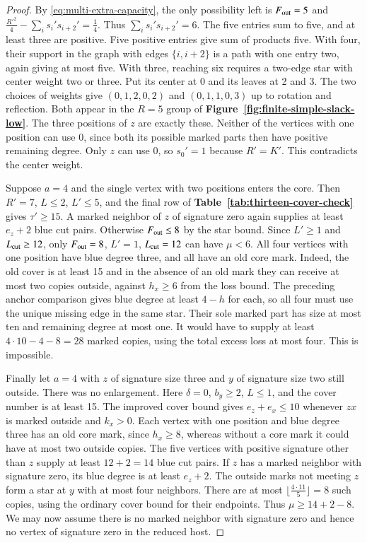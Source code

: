 \documentclass[preprint,11pt,numbers]{elsarticle-arxiv}
\numberwithin{equation}{section}
\theoremstyle{definition}
\begin{document}
\begin{proof}
By \eqref{eq:multi-extra-capacity}, the only possibility left is
$F_{\rm out}=5$ and
$\frac{R'^2}{4}-\sum_i s_i's_{i+2}'=\frac{1}{4}$. Thus $\sum_i s_i's_{i+2}'=6$.
The five entries sum to five, and at least three are positive.
Five positive entries give sum of products five. With four, their
support in the graph with edges $\{i,i+2\}$ is a path with one entry
two, again giving at most five. With three, reaching six requires a
two-edge star with center weight two or three. Put its center at 0
and its leaves at 2 and 3. The two choices of weights give
$(0,1,2,0,2)$ and $(0,1,1,0,3)$ up to rotation and reflection. Both
appear in the $R=5$ group of \textbf{Figure~\ref{fig:finite-simple-slack-low}}.
The three positions of $z$ are exactly
these. Neither of the vertices with one position can use 0, since
both its possible marked parts then have positive remaining degree.
Only $z$ can use 0, so $s_0'=1$ because $R'=K'$. This contradicts
the center weight.

Suppose $a=4$ and the single vertex with two positions enters the
core. Then $R'=7$, $L\le2$, $L'\le5$, and the final row of
\textbf{Table~\ref{tab:thirteen-cover-check}} gives $\tau'\ge15$. A marked neighbor of $z$ of signature
zero again supplies at least $e_z+2$ blue cut pairs. Otherwise
$F_{\rm out}\le8$ by the star bound. Since $L'\ge1$ and
$L_{\rm cut}\ge12$, only $F_{\rm out}=8$, $L'=1$, $L_{\rm cut}=12$
can have $\mu<6$. All four vertices with one position have blue
degree three, and all have an old core mark. Indeed, the old cover
is at least 15 and in the absence of an old mark they can receive
at most two copies outside, against $h_x\ge6$ from the loss bound.
The preceding anchor comparison gives blue degree at least $4-h$
for each, so all four must use the unique missing edge in the same
star. Their sole marked part has size at most ten and remaining degree
at most one. It would have to supply at least $4\cdot10-4-8=28$
marked copies, using the total excess loss at most four. This is
impossible.

Finally let $a=4$ with $z$ of signature size three and $y$ of
signature size two still outside. There was no enlargement. Here
$\delta=0$, $b_y\ge2$, $L\le1$, and the cover number is at least
15. The improved cover bound gives $e_z+e_x\le10$ whenever $zx$
is marked outside and $k_x>0$. Each vertex with one position and
blue degree three has an old core mark, since $h_x\ge8$, whereas
without a core mark it could have at most two outside copies.
The five vertices with positive signature other than $z$ supply
at least $12+2=14$ blue cut pairs. If $z$ has a marked neighbor with
signature zero, its blue degree is at least $e_z+2$. The outside
marks not meeting $z$ form a star at $y$ with at most four neighbors.
There are at most $\lfloor\frac{4\cdot11}{5}\rfloor=8$ such copies, using
the ordinary cover bound for their endpoints. Thus $\mu\ge14+2-8$.
We may now assume there is no marked neighbor with signature zero and
hence no vertex of signature zero in the reduced host.


\end{proof}
\end{document}
